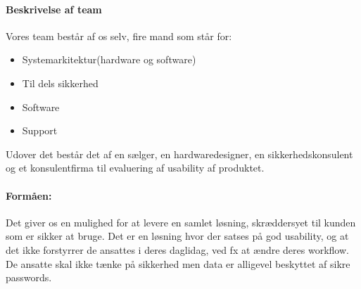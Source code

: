 \paragraph{Beskrivelse af team}
Vores team består af os selv, fire mand som står for:
\begin{itemize}
\item Systemarkitektur(hardware og software)
\item Til dels sikkerhed
\item Software
\item Support
\end{itemize}
Udover det består det af en sælger, en hardwaredesigner, en sikkerhedskonsulent og et konsulentfirma til evaluering af usability af produktet.
\paragraph{Formåen:}
Det giver os en mulighed for at levere en samlet løsning, skræddersyet til kunden som er sikker at bruge.
Det er en løsning hvor der satses på god usability, og at det ikke forstyrrer de ansattes i deres daglidag, ved fx at ændre deres workflow.
De ansatte skal ikke tænke på sikkerhed men data er alligevel beskyttet af sikre passwords.
